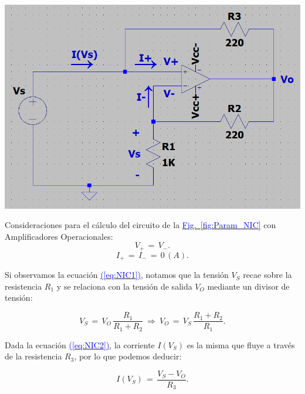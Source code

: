 \documentclass[12pt,a4paper]{report} %
\newcommand{\fref}[1]{\hyperref[#1]{\textcolor{blue}{Fig.~\ref*{#1}}}}
\newcommand{\eref}[1]{\hyperref[#1]{\textcolor{blue}{(\ref*{#1})}}}
\begin{document}
	\begin{center}
	\begin{multicols}{2}
		\centering
		\includegraphics[width=\columnwidth]{demotracion_NIC.png}
		\label{fig:Param_NIC}
	
		\columnbreak
		
		Consideraciones para el cálculo del circuito de la \fref{fig:Param_NIC} con Amplificadores Operacionales:\\
		\begin{equation}
			V_+\,=\,V_-.
			\label{eq:NIC1}
		\end{equation}
		\begin{equation}
			I_+\,=\,I_-\,=\,0\,(A).
			\label{eq:NIC2}
		\end{equation}
	\end{multicols}
	\end{center}
	
	\noindent Si observamos la ecuación \eref{eq:NIC1}, notamos que la tensión $V_S$ recae sobre la resistencia $R_1$ y se relaciona con la tensión de salida $V_O$ mediante un divisor de tensión:
	
	\begin{equation}
		V_S\,=\,V_O\,\frac{R_1}{R_1 + R_2}\:\Longrightarrow\:V_O\,=\,V_S\,\frac{R_1 + R_2}{R_1}.
		\label{eq:NIC3}
	\end{equation}\smallskip
	
	\noindent Dada la ecuación \eref{eq:NIC2}, la corriente $I(V_S)$ es la misma que fluye a través de la resistencia $R_3$, por lo que podemos deducir:
	
	\begin{equation}
		I(V_S)\,=\,\frac{V_S - V_O}{R_3}.
		\label{eq:NIC4}
	\end{equation}\smallskip
	
\end{document}
